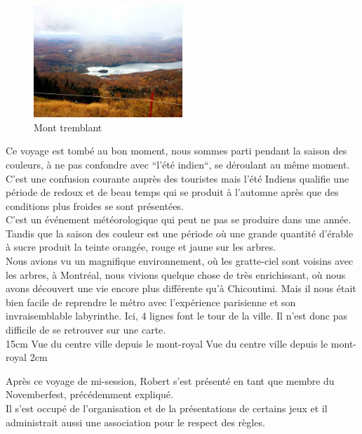 \begin{figure} %
    \centering
    \includegraphics[width=0.5\textwidth]{images/environnement_etudes/ete_indien.jpg}
    \caption{Mont tremblant}
    \label{fig:Mont_tremblant}
\end{figure}

Ce voyage est tombé au bon moment, nous sommes parti pendant la saison des couleurs, à ne pas confondre avec ``l'été indien``, se déroulant au même moment. C'est une confusion courante auprès des touristes mais l'été Indiens qualifie une période de redoux et de beau temps qui se produit à l'automne après que des conditions plus froides se sont présentées.\\

C'est un événement météorologique qui peut ne pas se produire dans une année. Tandis que la saison des couleur est une période où une grande quantité d'érable à sucre produit la teinte orangée, rouge et jaune sur les arbres.\\

Nous avions vu un magnifique environnement, où les gratte-ciel sont voisins avec les arbres, à Montréal, nous vivions quelque chose de très enrichissant, où nous avons découvert une vie encore plus différente qu'à Chicoutimi. Mais il nous était bien facile de reprendre le métro avec l'expérience parisienne et son invraisemblable labyrinthe. Ici, 4 lignes font le tour de la ville. Il n'est donc pas difficile de se retrouver sur une carte.\\

{15cm}
{Vue du centre ville depuis le mont-royal}
{Vue du centre ville depuis le mont-royal}
{2cm}

Après ce voyage de mi-session, Robert s'est présenté en tant que membre du Novemberfest, précédemment expliqué.\\
Il s'est occupé de l'organisation et de la présentations de certains jeux et il administrait aussi une association pour le respect des règles.\\

